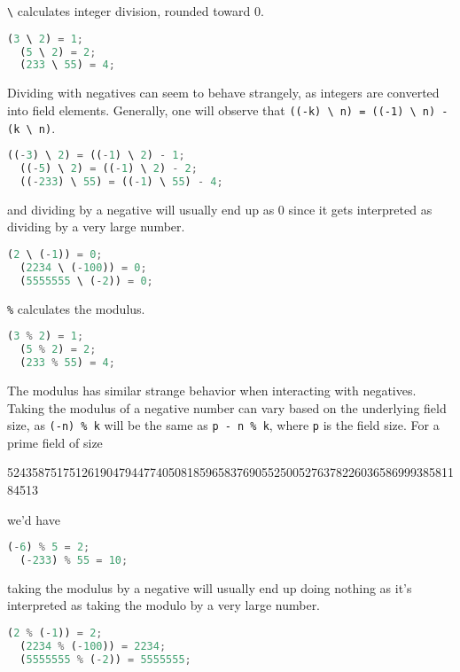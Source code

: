 \lstinline|\| calculates integer division, rounded toward 0.

\begin{lstlisting}[language=Python]
  (3 \ 2) = 1;
  (5 \ 2) = 2;
  (233 \ 55) = 4;
\end{lstlisting}

Dividing with negatives can seem to behave strangely, as integers are converted into field elements. Generally, one will observe that \lstinline|((-k) \ n) = ((-1) \ n) - (k \ n)|.

\begin{lstlisting}[language=Python]
  ((-3) \ 2) = ((-1) \ 2) - 1;
  ((-5) \ 2) = ((-1) \ 2) - 2;
  ((-233) \ 55) = ((-1) \ 55) - 4;
\end{lstlisting}

and dividing by a negative will usually end up as 0 since it gets interpreted as dividing by a very large number.

\begin{lstlisting}[language=Python]
  (2 \ (-1)) = 0;
  (2234 \ (-100)) = 0;
  (5555555 \ (-2)) = 0;
\end{lstlisting}

\lstinline|%| calculates the modulus.

\begin{lstlisting}[language=Python]
  (3 % 2) = 1;
  (5 % 2) = 2;
  (233 % 55) = 4;
\end{lstlisting}

The modulus has similar strange behavior when interacting with negatives. Taking the modulus of a negative number can vary based on the underlying field size, as \lstinline|(-n) % k| will be the same as  \lstinline|p - n % k|, where \lstinline|p| is the field size. For a prime field of size

52435875175126190479447740508185965837690552500527637822603658699938581184513

we'd have

\begin{lstlisting}[language=Python]
  (-6) % 5 = 2;
  (-233) % 55 = 10;
\end{lstlisting}

taking the modulus by a negative will usually end up doing nothing as it's interpreted as taking the modulo by a very large number.

\begin{lstlisting}[language=Python]
  (2 % (-1)) = 2;
  (2234 % (-100)) = 2234;
  (5555555 % (-2)) = 5555555;
\end{lstlisting}


